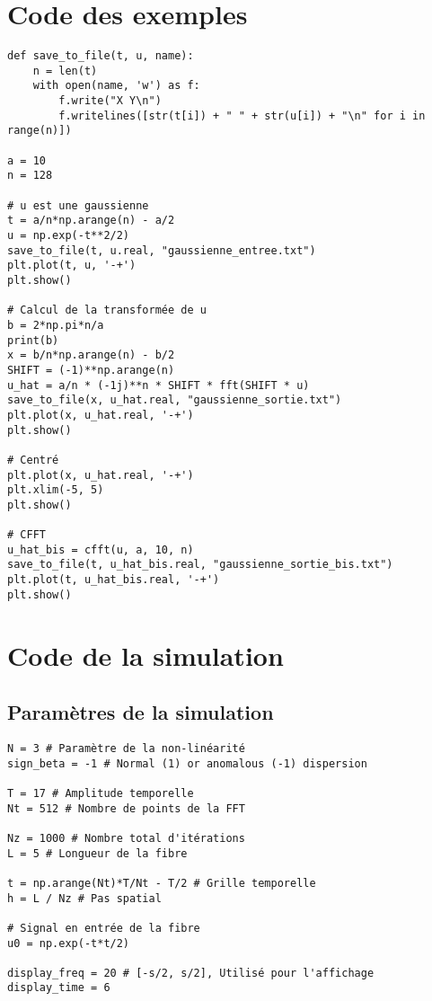 \documentclass{article}
\begin{document}
\section{Code des exemples}\label{appCodeEx}
\begin{verbatim}
def save_to_file(t, u, name):
    n = len(t)
    with open(name, 'w') as f:
        f.write("X Y\n")
        f.writelines([str(t[i]) + " " + str(u[i]) + "\n" for i in range(n)])

a = 10
n = 128

# u est une gaussienne
t = a/n*np.arange(n) - a/2
u = np.exp(-t**2/2)
save_to_file(t, u.real, "gaussienne_entree.txt")
plt.plot(t, u, '-+')
plt.show()

# Calcul de la transformée de u
b = 2*np.pi*n/a
print(b)
x = b/n*np.arange(n) - b/2
SHIFT = (-1)**np.arange(n)
u_hat = a/n * (-1j)**n * SHIFT * fft(SHIFT * u)
save_to_file(x, u_hat.real, "gaussienne_sortie.txt")
plt.plot(x, u_hat.real, '-+')
plt.show()

# Centré
plt.plot(x, u_hat.real, '-+')
plt.xlim(-5, 5)
plt.show()

# CFFT
u_hat_bis = cfft(u, a, 10, n)
save_to_file(t, u_hat_bis.real, "gaussienne_sortie_bis.txt")
plt.plot(t, u_hat_bis.real, '-+')
plt.show()
\end{verbatim}

\clearpage
\section{Code de la simulation}\label{appCodeSim}
\subsection{Paramètres de la simulation}\label{appParam}
\begin{verbatim}
N = 3 # Paramètre de la non-linéarité
sign_beta = -1 # Normal (1) or anomalous (-1) dispersion

T = 17 # Amplitude temporelle
Nt = 512 # Nombre de points de la FFT

Nz = 1000 # Nombre total d'itérations
L = 5 # Longueur de la fibre

t = np.arange(Nt)*T/Nt - T/2 # Grille temporelle
h = L / Nz # Pas spatial

# Signal en entrée de la fibre
u0 = np.exp(-t*t/2) 

display_freq = 20 # [-s/2, s/2], Utilisé pour l'affichage
display_time = 6
\end{verbatim}
\end{document}
